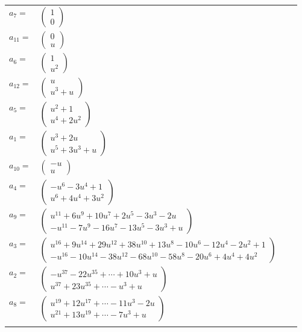 \documentclass[1p]{elsarticle_modified}
\theoremstyle{definition}
\begin{document}
\begin{tabular}{m{7pt} m{180pt} m{7pt} m{180pt} }
\flushright $a_{7}=$&$\begin{pmatrix}1\\0\end{pmatrix}$ \\
\flushright $a_{11}=$&$\begin{pmatrix}0\\u\end{pmatrix}$ \\
\flushright $a_{6}=$&$\begin{pmatrix}1\\u^2\end{pmatrix}$ \\
\flushright $a_{12}=$&$\begin{pmatrix}u\\u^3+u\end{pmatrix}$ \\
\flushright $a_{5}=$&$\begin{pmatrix}u^2+1\\u^4+2 u^2\end{pmatrix}$ \\
\flushright $a_{1}=$&$\begin{pmatrix}u^3+2 u\\u^5+3 u^3+u\end{pmatrix}$ \\
\flushright $a_{10}=$&$\begin{pmatrix}- u\\u\end{pmatrix}$ \\
\flushright $a_{4}=$&$\begin{pmatrix}- u^6-3 u^4+1\\u^6+4 u^4+3 u^2\end{pmatrix}$ \\
\flushright $a_{9}=$&$\begin{pmatrix}u^{11}+6 u^9+10 u^7+2 u^5-3 u^3-2 u\\- u^{11}-7 u^9-16 u^7-13 u^5-3 u^3+u\end{pmatrix}$ \\
\flushright $a_{3}=$&$\begin{pmatrix}u^{16}+9 u^{14}+29 u^{12}+38 u^{10}+13 u^8-10 u^6-12 u^4-2 u^2+1\\- u^{16}-10 u^{14}-38 u^{12}-68 u^{10}-58 u^8-20 u^6+4 u^4+4 u^2\end{pmatrix}$ \\
\flushright $a_{2}=$&$\begin{pmatrix}- u^{37}-22 u^{35}+\cdots+10 u^3+u\\u^{37}+23 u^{35}+\cdots- u^3+u\end{pmatrix}$ \\
\flushright $a_{8}=$&$\begin{pmatrix}u^{19}+12 u^{17}+\cdots-11 u^3-2 u\\u^{21}+13 u^{19}+\cdots-7 u^3+u\end{pmatrix}$\\&\end{tabular}
\end{document}
